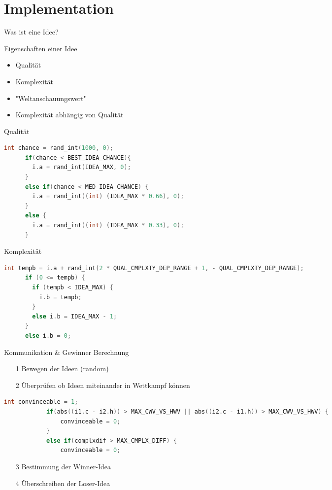 \section{Implementation}

\begin{frame}{Was ist eine Idee?}
	\begin{block}{Eigenschaften einer Idee}
		\begin{itemize}
			\item Qualität
			\item Komplexität
			\item "Weltanschauungswert"
			\item Komplexität abhängig von Qualität
		\end{itemize}
	\end{block}
\end{frame}

\begin{frame}[fragile]{Qualität}
	\begin{lstlisting}[language=C,basicstyle=\small,keywordstyle=\color{black}]
	 int chance = rand_int(1000, 0);
	  if(chance < BEST_IDEA_CHANCE){
	    i.a = rand_int(IDEA_MAX, 0);
	  }
	  else if(chance < MED_IDEA_CHANCE) {
	    i.a = rand_int((int) (IDEA_MAX * 0.66), 0);
	  }
	  else {
	    i.a = rand_int((int) (IDEA_MAX * 0.33), 0);
	  }
	  \end{lstlisting}
\end{frame}

\begin{frame}[fragile]{Komplexität}
	\begin{lstlisting}[language=C,basicstyle=\small,keywordstyle=\color{black}]
	int tempb = i.a + rand_int(2 * QUAL_CMPLXTY_DEP_RANGE + 1, - QUAL_CMPLXTY_DEP_RANGE);
	  if (0 <= tempb) {
	    if (tempb < IDEA_MAX) {
	      i.b = tempb;
	    } 
	    else i.b = IDEA_MAX - 1;
	  } 
	  else i.b = 0;
	\end{lstlisting}
\end{frame}

\begin{frame}[fragile] {Kommunikation \& Gewinner Berechnung}
	\begin{itemize}
	\item[1] Bewegen der Ideen (random)
	\item[2] Überprüfen ob Ideen miteinander in Wettkampf können 
	\end{itemize}
		\begin{lstlisting}[language=C,basicstyle=\small,keywordstyle=\color{black}]
			int convinceable = 1;
			if(abs((i1.c - i2.h)) > MAX_CWV_VS_HWV || abs((i2.c - i1.h)) > MAX_CWV_VS_HWV) {
	    		convinceable = 0;
	  		} 
	  		else if(complxdif > MAX_CMPLX_DIFF) {
	    		convinceable = 0;
		\end{lstlisting}	
	\begin{itemize}
	\item[3] Bestimmung der Winner-Idea 
	\item[4] Überschreiben der Loser-Idea
	\end{itemize}
\end{frame}

